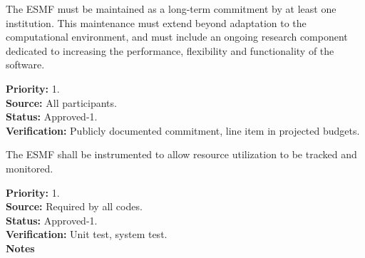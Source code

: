The ESMF must be maintained as a long-term commitment by at least one
institution.  This maintenance must extend beyond adaptation to the 
computational environment, and must include an ongoing research component
dedicated to increasing the performance, flexibility and functionality of
the software.
\begin{reqlist}
{\bf Priority:} 1. \\
{\bf Source:} All participants. \\
{\bf Status:} Approved-1. \\
{\bf Verification:} Publicly documented commitment, line item in 
projected budgets.
\end{reqlist}


The ESMF shall be instrumented to allow resource utilization
to be tracked and monitored.
\label{req:gr:error_handling}
\begin{reqlist}
  {\bf Priority:} 1. \\
  {\bf Source:} Required by all codes. \\
  {\bf Status:} Approved-1. \\
  {\bf Verification:} Unit test, system test.\\
  {\bf Notes}
\end{reqlist}





